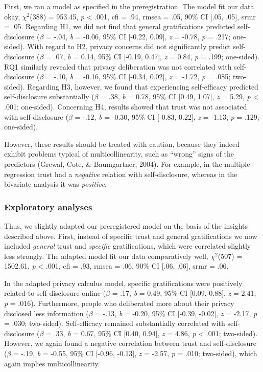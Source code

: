 \documentclass[
  english,
  man,floatsintext]{apa6}
\begin{document}
First, we ran a model as specified in the preregistration. The model fit our data okay, \(\chi^2\)(388) = 953.45, \textit{p} \textless{} .001, cfi = .94, rmsea = .05, 90\% CI {[}.05, .05{]}, srmr = .05.
Regarding H1, we did not find that general gratifications predicted self-disclosure (\(\beta\) = -.04, \textit{b} = -0.06, 95\% CI {[}-0.22, 0.09{]}, \textit{z} = -0.78, \textit{p} = .217; one-sided).
With regard to H2, privacy concerns did not significantly predict self-disclosure (\(\beta\) = .07, \textit{b} = 0.14, 95\% CI {[}-0.19, 0.47{]}, \textit{z} = 0.84, \textit{p} = .199; one-sided).
RQ1 similarly revealed that privacy deliberation was not correlated with self-disclosure (\(\beta\) = -.10, \textit{b} = -0.16, 95\% CI {[}-0.34, 0.02{]}, \textit{z} = -1.72, \textit{p} = .085; two-sided).
Regarding H3, however, we found that experiencing self-efficacy predicted self-disclosure substantially (\(\beta\) = .38, \textit{b} = 0.78, 95\% CI {[}0.49, 1.07{]}, \textit{z} = 5.29, \textit{p} \textless{} .001; one-sided).
Concerning H4, results showed that trust was not associated with self-disclosure (\(\beta\) = -.12, \textit{b} = -0.30, 95\% CI {[}-0.83, 0.22{]}, \textit{z} = -1.13, \textit{p} = .129; one-sided).

However, these results should be treated with caution, because they indeed exhibit problems typical of multicollinearity, such as \enquote{wrong} signs of the predictors (Grewal, Cote, \& Baumgartner, 2004).
For example, in the multiple regression trust had a \emph{negative} relation with self-disclosure, whereas in the bivariate analysis it was \emph{positive}.

\hypertarget{exploratory-analyses}{%
\subsubsection{Exploratory analyses}\label{exploratory-analyses}}

Thus, we slightly adapted our preregistered model on the basis of the insights described above.
First, instead of specific trust and general gratifications we now included \emph{general} trust and \emph{specific} gratifications, which were correlated slightly less strongly.
The adapted model fit our data comparatively well, \(\chi^2\)(507) = 1502.61, \textit{p} \textless{} .001, cfi = .93, rmsea = .06, 90\% CI {[}.06, .06{]}, srmr = .06.

In the adapted privacy calculus model, specific gratifications were positively related to self-disclosure online (\(\beta\) = .17, \textit{b} = 0.49, 95\% CI {[}0.09, 0.88{]}, \textit{z} = 2.41, \textit{p} = .016).
Furthermore, people who deliberated more about their privacy disclosed less information (\(\beta\) = -.13, \textit{b} = -0.20, 95\% CI {[}-0.39, -0.02{]}, \textit{z} = -2.17, \textit{p} = .030; two-sided).
Self-efficacy remained substantially correlated with self-disclosure (\(\beta\) = .33, \textit{b} = 0.67, 95\% CI {[}0.40, 0.94{]}, \textit{z} = 4.86, \textit{p} \textless{} .001; two-sided).
However, we again found a negative correlation between trust and self-disclosure (\(\beta\) = -.19, \textit{b} = -0.55, 95\% CI {[}-0.96, -0.13{]}, \textit{z} = -2.57, \textit{p} = .010; two-sided), which again implies multicollinearity.
\end{document}
